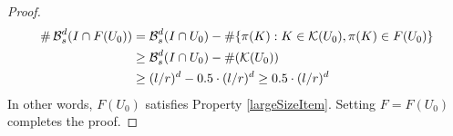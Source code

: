 \begin{proof}
	\begin{align*}
		\# \operatorname{\mathcal{B}}_s^d(I \cap F(U_0)) &= \operatorname{\mathcal{B}}_s^d(I \cap U_0) - \# \{ \pi(K) : K \in \mathcal{K}(U_0), \pi(K) \in F(U_0) \}\\
		&\geq \operatorname{\mathcal{B}}_s^d(I \cap U_0) - \#(\mathcal{K}(U_0))\\
		&\geq (l/r)^d - 0.5 \cdot (l/r)^d \geq 0.5 \cdot (l/r)^d
	\end{align*}  
	In other words, $F(U_0)$ satisfies Property \ref{largeSizeItem}. Setting $F = F(U_0)$ completes the proof.
\end{proof}

